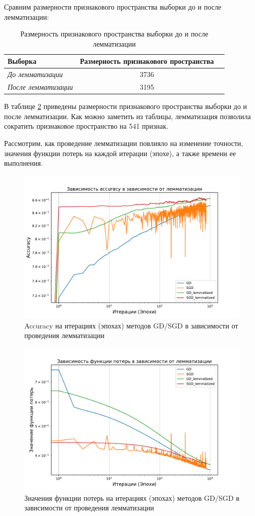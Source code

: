 \documentclass[14pt]{extarticle}
\begin{document}
Сравним размерности признакового пространства выборки до и после лемматизации:

\begin{table}[H]
    \centering
    \begin{tabular}{|l|c|c|}
        \hline
        Выборка & Размерность признакового пространства \\ \hline
        \textit{До лемматизации} & 3736 \\ \hline
        \textit{После лемматизации} & 3195 \\ \hline
    \end{tabular}
    \caption{Размерность признакового пространства выборки до и после лемматизации}
    \label{tab:exp_7_lemm_dim}
\end{table}

В таблице \hyperref[tab:exp_7_lemm_dim]{2} приведены размерности признакового пространства выборки до и после лемматизации. Как можно заметить из таблицы, лемматизация позволила сократить признаковое пространство на 541 признак.

Рассмотрим, как проведение лемматизации повлияло на изменение точности, значения функции потерь на каждой итерации (эпохе), а также времени ее выполнения.

\begin{figure}[H]
    \centering
    \includegraphics[width=0.7\linewidth]
    {exp_7_acc.pdf}
    \caption{Accuracy на итерациях (эпохах) методов GD/SGD в зависимости от проведения лемматизации}
    \label{fig:exp_7_acc}
\end{figure}

\begin{figure}[H]
    \centering
    \includegraphics[width=0.7\linewidth]
    {exp_7_loss.pdf}
    \caption{Значения функции потерь на итерациях (эпохах) методов GD/SGD в зависимости от проведения лемматизации}
    \label{fig:exp_7_loss}
\end{figure}
\end{document}
